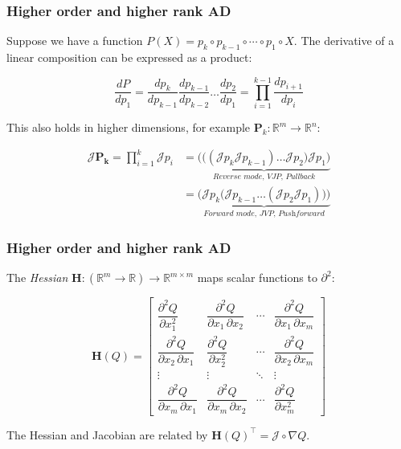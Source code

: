 \documentclass{beamer}
\begin{document}
    \begin{frame}
        \frametitle{Higher order and higher rank AD}

        Suppose we have a function $P(X) = p_k \circ p_{k-1} \circ \cdots \circ p_1 \circ X$. The derivative of a linear composition can be expressed as a product:

        \begin{equation*}
            \label{eq:sfun_chain_rule}
            \frac{dP}{dp_1} = \frac{dp_k}{dp_{k-1}}\frac{dp_{k-1}}{dp_{k-2}}\dots\frac{dp_2}{dp_1}= {\displaystyle \prod_{i=1}^{k-1} \frac{dp_{i+1}}{dp_{i}}}
        \end{equation*}

        This also holds in higher dimensions, for example $\mathbf{P}_k: \mathbb{R}^m\rightarrow\mathbb{R}^n$:

        \begin{align*}
            \label{eq:vfun_chain_rule}
            \mathcal{J} \mathbf{P_k} = \displaystyle \prod_{i=1}^{k} \mathcal{J}p_i &= \underbrace{\bigg(\Big((\mathcal{J}p_k \mathcal{J}p_{k-1}) \dots \mathcal{J}p_2\Big) \mathcal{J}p_1\bigg)}_{\textit{Reverse mode, VJP, Pullback}} \\
            &= \underbrace{\bigg(\mathcal{J}p_k \Big(\mathcal{J}p_{k-1} \dots (\mathcal{J}p_2 \mathcal{J}p_1)\Big)\bigg)}_{\textit{Forward mode, JVP, Pushforward}}
        \end{align*}
    \end{frame}

    \begin{frame}
        \frametitle{Higher order and higher rank AD}

        The \textit{Hessian} $\mathbf{H}:(\mathbb{R}^m\rightarrow\mathbb{R})\rightarrow\mathbb{R}^{m\times m}$ maps scalar functions to $\partial^2$:

        \begin{equation*}
            \mathbf{H}(Q) = \begin{bmatrix}{\dfrac {\partial ^{2}Q}{\partial x_{1}^{2}}}
                                &{\dfrac {\partial ^{2}Q}{\partial x_{1}\,\partial x_{2}}}&\cdots &{\dfrac {\partial ^{2}Q}{\partial x_{1}\,\partial x_{m}}}\\[2.2ex]{\dfrac {\partial ^{2}Q}{\partial x_{2}\,\partial x_{1}}}&{\dfrac {\partial ^{2}Q}{\partial x_{2}^{2}}}&\cdots &{\dfrac {\partial ^{2}Q}{\partial x_{2}\,\partial x_{m}}}\\[2.2ex]\vdots &\vdots &\ddots &\vdots \\[2.2ex]{\dfrac {\partial ^{2}Q}{\partial x_{m}\,\partial x_{1}}}&{\dfrac {\partial ^{2}Q}{\partial x_{m}\,\partial x_{2}}}&\cdots &{\dfrac {\partial ^{2}Q}{\partial x_{m}^{2}}}
            \end{bmatrix}
        \end{equation*}

        The Hessian and Jacobian are related by $\mathbf{H}(Q)^\intercal = \mathcal{J} \circ \nabla Q$.
    \end{frame}
\end{document}
